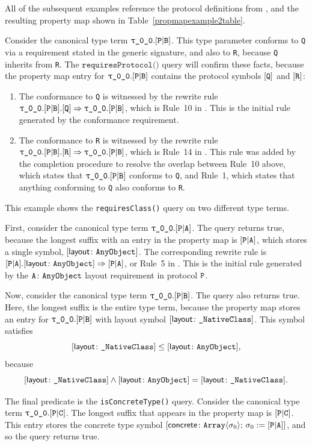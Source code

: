\documentclass[../generics]{subfiles}
\begin{document}
All of the subsequent examples reference the protocol definitions from , and the resulting property map shown in Table~\ref{propmapexample2table}.
\begin{example} Consider the canonical type term $\rT.\assocsym{P}{B}$. This type parameter conforms to \texttt{Q} via a requirement stated in the generic signature, and also to \texttt{R}, because \texttt{Q} inherits from \texttt{R}. The $\texttt{requiresProtocol()}$ query will confirm these facts, because the property map entry for $\rT.\assocsym{P}{B}$ contains the protocol symbols $[\texttt{Q}]$ and $[\texttt{R}]$:
\begin{enumerate}
\item The conformance to \texttt{Q} is witnessed by the rewrite rule $\rT.\assocsym{P}{B}.\pQ\Rightarrow \rT.\assocsym{P}{B}$, which is Rule~10 in . This is the initial rule generated by the conformance requirement.
\item The conformance to \texttt{R} is witnessed by the rewrite rule $\rT.\assocsym{P}{B}.\pR\Rightarrow \rT.\assocsym{P}{B}$, which is Rule~14 in . This rule was added by the completion procedure to resolve the overlap between Rule~10 above, which states that $\rT.\assocsym{P}{B}$ conforms to \texttt{Q}, and Rule~1, which states that anything conforming to \texttt{Q} also conforms to \texttt{R}.
\end{enumerate}
\end{example}
\begin{example} This example shows the \texttt{requiresClass()} query on two different type terms.

First, consider the canonical type term $\rT.\assocsym{P}{A}$. The query returns true, because the longest suffix with an entry in the property map is $[\texttt{P}|\texttt{A}]$, which stores a single symbol, $[\mathsf{layout}\colon\texttt{AnyObject}]$. The corresponding rewrite rule is $[\texttt{P}|\texttt{A}].[\mathsf{layout}\colon\texttt{AnyObject}]\Rightarrow[\texttt{P}|\texttt{A}]$, or Rule~5 in . This is the initial rule generated by the $\texttt{A}\colon\texttt{AnyObject}$ layout requirement in protocol $\texttt{P}$.

Now, consider the canonical type term $\rT.\assocsym{P}{B}$. The query also returns true. Here, the longest suffix is the entire type term, because the property map stores an entry for $\rT.\assocsym{P}{B}$ with layout symbol $[\mathsf{layout}\colon\texttt{\_NativeClass}]$. This symbol satisfies
\[[\mathsf{layout}\colon\texttt{\_NativeClass}]\leq[\mathsf{layout}\colon\texttt{AnyObject}],\]
because
\[[\mathsf{layout}\colon\texttt{\_NativeClass}]\wedge [\mathsf{layout}\colon\texttt{AnyObject}]=[\mathsf{layout}\colon\texttt{\_NativeClass}].\]
\end{example}
\begin{example}
The final predicate is the \texttt{isConcreteType()} query. Consider the canonical type term $\rT.\assocsym{P}{C}$. The longest suffix that appears in the property map is $[\texttt{P}|\texttt{C}]$. This entry stores the concrete type symbol $[\mathsf{concrete}\colon \texttt{Array}\langle\sigma_0\rangle;\,\sigma_0:=[\texttt{P}|\texttt{A}]]$, and so the query returns true.
\end{example}
\end{document}
